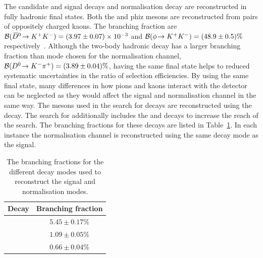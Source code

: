 The candidate \decay{\Bp}{\Dsp\Kp\Km} and \decay{\Bp}{\Dsp\phiz} signal decays and \decay{\Bp}{\Dsp\Dzb} normalisation decay are reconstructed in fully hadronic final states. Both the \Dzb and phiz mesons are reconstructed from pairs of oppositely charged kaons. The branching fraction are ${\mathcal{B}}({{\kern 0.2em\overline{\kern -0.2em D}{}}{}^0}\!\rightarrow {\ensuremath{{K}^+}}{\ensuremath{{K}^-}})= (3.97 \pm 0.07)\times 10^{-3}$ and ${\mathcal{B}}(\phi\!\rightarrow {\ensuremath{{K}^+}}{\ensuremath{{K}^-}})= (48.9 \pm 0.5)\%$ respectively~\cite{PDG2016}. Although the two-body hadronic decay \decay{\Dz}{\Km\pip} has a larger branching fraction than mode chosen for the normalisation channel, ${\mathcal{B}}({{D}^0}\!\rightarrow {\ensuremath{{K}^-}}{\ensuremath{{\pi}^+}})= (3.89 \pm 0.04)\%$, having the same final state helps to reduced systematic uncertainties in the ratio of selection efficiencies. By using the same final state, many differences in how pions and kaons interact with the detector can be neglected as they would affect the signal and normalisation channel in the same way.
The \Dsp mesons used in the search for \decay{\Bp}{\Dsp\Kp\Km} decays are reconstructed using the \decay{\Dsp}{\Kp\Km\pip} decay. The search for \decay{\Bp}{\Dsp\phiz} additionally includes the \decay{\Dsp}{\pip\pim\pip} and \decay{\Dsp}{\Kp\pim\pip} decays to increase the reach of the search. The branching fractions for these decays are listed in Table~\ref{tab:dsbranchingfractions}. In each instance the normalisation channel is reconstructed using the same \Dsp decay mode as the signal.  


\begin{table}[t]
   \begin{center}
      \begin{tabular}{lc}
         \hline
         Decay                         &  Branching fraction \\
         \hline 
         \decay{\Dsp}{\Kp\Km\pip}      & $5.45 \pm 0.17 \%$ \\
         \decay{\Dsp}{\pip\pim\pip}    & $1.09 \pm 0.05 \%$ \\
         \decay{\Dsp}{\Kp\pim\pip}     & $0.66 \pm 0.04 \%$ \\
         \hline
      \end{tabular}
   \end{center}
   \caption{The branching fractions for the different \Dsp decay modes used to reconstruct the signal and normalisation modes.}
   \label{tab:dsbranchingfractions}
\end{table}



